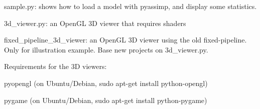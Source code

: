 
\begin{DoxyItemize}
\item {\ttfamily sample.\+py}\+: shows how to load a model with pyassimp, and display some statistics.
\item {\ttfamily 3d\+\_\+viewer.\+py}\+: an Open\+G\+L 3\+D viewer that requires shaders
\item {\ttfamily fixed\+\_\+pipeline\+\_\+3d\+\_\+viewer}\+: an Open\+G\+L 3\+D viewer using the old fixed-\/pipeline. Only for illustration example. Base new projects on {\ttfamily 3d\+\_\+viewer.\+py}.
\end{DoxyItemize}

Requirements for the 3\+D viewers\+:


\begin{DoxyItemize}
\item {\ttfamily pyopengl} (on Ubuntu/\+Debian, {\ttfamily sudo apt-\/get install python-\/opengl})
\item {\ttfamily pygame} (on Ubuntu/\+Debian, {\ttfamily sudo apt-\/get install python-\/pygame}) 
\end{DoxyItemize}
